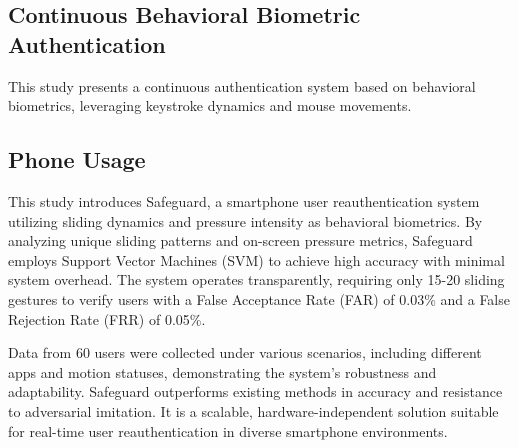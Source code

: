 \subsection{Continuous Behavioral Biometric Authentication}
\label{subsec:continuous-behavioral-biometric-authentication}

\parencite{4_Continuous_Authentication}
This study presents a continuous authentication system based on behavioral biometrics, leveraging keystroke dynamics and mouse movements.

\subsection{Phone Usage}

\parencite{17_Phone} This study introduces Safeguard, a smartphone user reauthentication system utilizing sliding dynamics and pressure intensity as behavioral biometrics. By analyzing unique sliding patterns and on-screen pressure metrics, Safeguard employs Support Vector Machines (SVM) to achieve high accuracy with minimal system overhead. The system operates transparently, requiring only 15-20 sliding gestures to verify users with a False Acceptance Rate (FAR) of 0.03\% and a False Rejection Rate (FRR) of 0.05\%.

Data from 60 users were collected under various scenarios, including different apps and motion statuses, demonstrating the system's robustness and adaptability. Safeguard outperforms existing methods in accuracy and resistance to adversarial imitation. It is a scalable, hardware-independent solution suitable for real-time user reauthentication in diverse smartphone environments.
